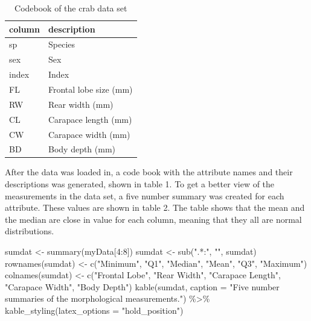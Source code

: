 \documentclass[
]{article}
\newenvironment{Shaded}{}{}
\newcommand{\AttributeTok}[1]{#1}
\newcommand{\DecValTok}[1]{#1}
\newcommand{\FunctionTok}[1]{#1}
\newcommand{\NormalTok}[1]{#1}
\newcommand{\OtherTok}[1]{\textcolor[rgb]{1.00,0.25,0.00}{#1}}
\newcommand{\SpecialCharTok}[1]{\textcolor[rgb]{0.00,0.50,0.50}{#1}}
\newcommand{\StringTok}[1]{\textcolor[rgb]{0.00,0.50,0.50}{#1}}
\begin{document}
\begin{table}[!h]

\caption{\label{tab:Reading data}Codebook of the crab data set}
\centering
\fontsize{10}{12}\selectfont
\begin{tabular}[t]{l|l}
\hline
column & description\\
\hline
sp & Species\\
\hline
sex & Sex\\
\hline
index & Index\\
\hline
FL & Frontal lobe size (mm)\\
\hline
RW & Rear width (mm)\\
\hline
CL & Carapace length (mm)\\
\hline
CW & Carapace width (mm)\\
\hline
BD & Body depth (mm)\\
\hline
\end{tabular}
\end{table}

After the data was loaded in, a code book with the attribute names and
their descriptions was generated, shown in table 1. To get a better view
of the measurements in the data set, a five number summary was created
for each attribute. These values are shown in table 2. The table shows
that the mean and the median are close in value for each column, meaning
that they all are normal distributions.

\begin{Shaded}
\begin{Highlighting}[]
\NormalTok{sumdat }\OtherTok{\textless{}{-}} \FunctionTok{summary}\NormalTok{(myData[}\DecValTok{4}\SpecialCharTok{:}\DecValTok{8}\NormalTok{])}
\NormalTok{sumdat }\OtherTok{\textless{}{-}} \FunctionTok{sub}\NormalTok{(}\StringTok{".*:"}\NormalTok{, }\StringTok{""}\NormalTok{, sumdat)}
\FunctionTok{rownames}\NormalTok{(sumdat) }\OtherTok{\textless{}{-}}  \FunctionTok{c}\NormalTok{(}\StringTok{"Minimum"}\NormalTok{, }\StringTok{"Q1"}\NormalTok{, }\StringTok{"Median"}\NormalTok{, }\StringTok{"Mean"}\NormalTok{, }\StringTok{"Q3"}\NormalTok{, }\StringTok{"Maximum"}\NormalTok{)}
\FunctionTok{colnames}\NormalTok{(sumdat) }\OtherTok{\textless{}{-}} \FunctionTok{c}\NormalTok{(}\StringTok{"Frontal Lobe"}\NormalTok{, }\StringTok{"Rear Width"}\NormalTok{, }\StringTok{"Carapace Length"}\NormalTok{, }\StringTok{"Carapace Width"}\NormalTok{, }\StringTok{"Body Depth"}\NormalTok{)}
\FunctionTok{kable}\NormalTok{(sumdat, }\AttributeTok{caption =} \StringTok{"Five number summaries of the morphological measurements."}\NormalTok{) }\SpecialCharTok{\%\textgreater{}\%} 
\FunctionTok{kable\_styling}\NormalTok{(}\AttributeTok{latex\_options =} \StringTok{"hold\_position"}\NormalTok{)}
\end{Highlighting}
\end{Shaded}
\end{document}
